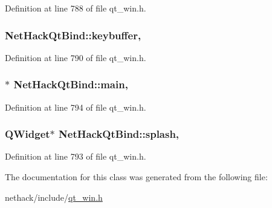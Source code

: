 Definition at line 788 of file qt\+\_\+win.\+h.

\hypertarget{classNetHackQtBind_a4a432163d33117d09015052e177c5f6a}{
\subsubsection[{keybuffer}]{ Net\+Hack\+Qt\+Bind\+::keybuffer\hspace{0.3cm}{\ttfamily [static]}, {\ttfamily [private]}}}\label{classNetHackQtBind_a4a432163d33117d09015052e177c5f6a}


Definition at line 790 of file qt\+\_\+win.\+h.

\hypertarget{classNetHackQtBind_ad7abed4190c5c282faecf0c1880bdddc}{
\subsubsection[{main}]{$\ast$ Net\+Hack\+Qt\+Bind\+::main\hspace{0.3cm}{\ttfamily [static]}, {\ttfamily [private]}}}\label{classNetHackQtBind_ad7abed4190c5c282faecf0c1880bdddc}


Definition at line 794 of file qt\+\_\+win.\+h.

\hypertarget{classNetHackQtBind_a4671d0721cd330c6b1bcb16963881a4b}{
\subsubsection[{splash}]{\setlength{\rightskip}{0pt plus 5cm}Q\+Widget$\ast$ Net\+Hack\+Qt\+Bind\+::splash\hspace{0.3cm}{\ttfamily [static]}, {\ttfamily [private]}}}\label{classNetHackQtBind_a4671d0721cd330c6b1bcb16963881a4b}


Definition at line 793 of file qt\+\_\+win.\+h.



The documentation for this class was generated from the following file\+:\begin{DoxyCompactItemize}
\item 
nethack/include/\hyperlink{qt__win_8h}{qt\+\_\+win.\+h}\end{DoxyCompactItemize}
